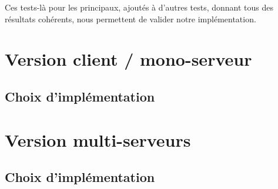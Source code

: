 \documentclass{report}
\begin{document}
Ces tests-là pour les principaux, ajoutés à d'autres tests, donnant tous des résultats cohérents, nous permettent de valider notre implémentation.

\chapter{Version client / mono-serveur}

\section{Choix d'implémentation}

\chapter{Version multi-serveurs}

\section{Choix d'implémentation}
\end{document}
